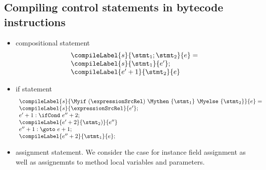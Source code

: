 \subsection{Compiling control statements in bytecode instructions} \label{compCtrlStmt}
\begin{itemize}
  \item compositional statement 
      $$\begin{array}{l} \compileLabel{s}{\stmt_1; \stmt_2}{e} = \\  
      
            \compileLabel{s}{\stmt_1}{e'};\\
	    
	    \compileLabel{e'+1}{\stmt_2}{e}
       \end{array}$$
    
  \item   if statement
    $$\begin{array}{l} \compileLabel{s}{ \Myif \ ( \expressionSrcRel ) \ \Mythen \ \{ \stmt_1 \} \  \Myelse \ \{ \stmt_2 \}   }{e} =  \\
        
	    \compileLabel{s}{\expressionSrcRel}{e'}; \\
            e' + 1: \ifCond \ e'' + 2;\\
            \compileLabel{e' + 2}{\stmt_2)}{e''}\\
             e'' + 1: \goto \ e +  1; \\
            \compileLabel{e'' +  2}{\stmt_1}{ e  }; \\
	\end{array}
    $$


\item assignment statement. We consider the case for  instance field assignment as well as  assignemnts to method local variables and parameters. 

\end{itemize}
